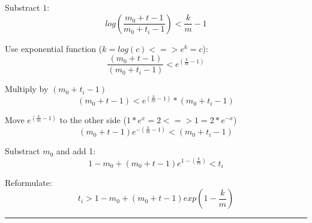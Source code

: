 \begin{enumerate}
	Substract $1$:
	\begin{equation*}
		log(\frac{m_0 + t - 1}{m_0 + t_i - 1}) < \frac{k}{m} - 1
	\end{equation*}
	
	
	Use exponential function ($k=log(c) <=> e^k=c$):
	\begin{equation*}
		\frac{(m_0 + t - 1)}{(m_0 + t_i - 1)} < e^{(\frac{k}{m} - 1)}
	\end{equation*}
	
	Multiply by $(m_0 + t_i - 1)$
	\begin{equation*}
		(m_0 + t - 1) < e^{(\frac{k}{m} - 1)} * (m_0 + t_i - 1)
	\end{equation*}
	
	Move $e^{(\frac{k}{m} - 1)}$ to the other side ($1 * e^x = 2 <=> 1 = 2 * e^{-x} $)
	\begin{equation*}
		(m_0 + t - 1) e^{-(\frac{k}{m} - 1)} < (m_0 + t_i - 1)
	\end{equation*}
	
	Substract $m_0$ and add 1:
	\begin{equation*}
		1 - m_0 + (m_0 + t - 1) e^{1 - (\frac{k}{m})} < t_i
	\end{equation*}
	
	Reformulate:
	\begin{equation*}
		t_i > 1 - m_0 + (m_0 + t - 1) exp(1 - \frac{k}{m})
	\end{equation*}
	
	\hrule \relax

\end{enumerate}